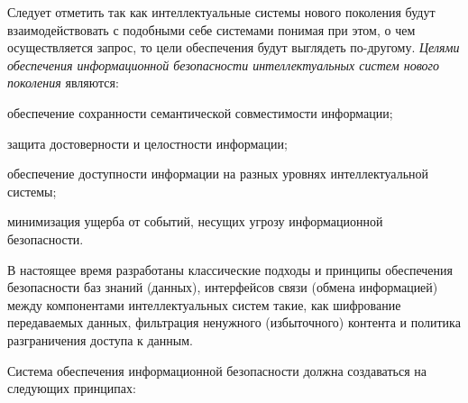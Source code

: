 Следует отметить так как интеллектуальные системы нового поколения будут взаимодействовать с подобными себе системами понимая при этом, о чем осуществляется запрос, то цели обеспечения будут выглядеть по-другому. \textit{Целями обеспечения информационной безопасности интеллектуальных систем нового поколения} являются:

\begin{textitemize}
	\item обеспечение сохранности семантической совместимости информации;
	\item защита достоверности и целостности информации;
	\item обеспечение доступности информации на разных уровнях интеллектуальной системы;
	\item минимизация ущерба от событий, несущих угрозу информационной безопасности.
\end{textitemize}

В настоящее время разработаны классические подходы и принципы обеспечения безопасности баз знаний (данных), интерфейсов связи (обмена информацией) между компонентами интеллектуальных систем такие, как шифрование передаваемых данных, фильтрация ненужного (избыточного) контента и политика разграничения доступа к данным.

Система обеспечения информационной безопасности должна создаваться на следующих принципах:

